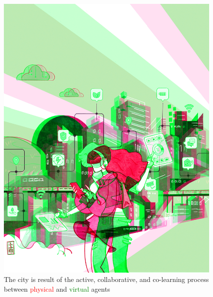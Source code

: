 \setcounter{figure}{-1}
\begin{figure}[htbp!]
    \centering
    \includegraphics[width=1\textwidth]{chapters/00_introduction/figures/fig_01_the_city_is_result_r.jpg}
    \captionsetup{format=plain, justification=centering} %
    \caption{The city is result of the active, collaborative, and co-learning process between \textcolor{red}{physical} and \textcolor{green}{virtual} agents}
   \label{fig:gree_red}
\end{figure}
\FloatBarrier


